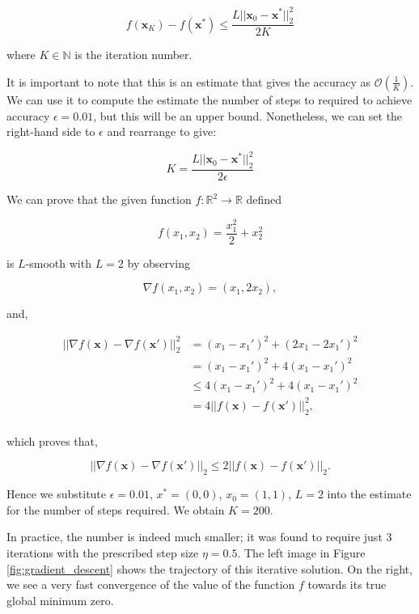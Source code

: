 \documentclass[12pt]{article}
\begin{document}
\[f(\bm{x}_K) - f(\bm{x}^*) \leq \frac{L||\bm{x}_0-\bm{x}^*||_2^2}{2K}\]

where $K\in\mathbb{N}$ is the iteration number.

It is important to note that this is an estimate that gives the accuracy as $\mathcal{O}(\frac{1}{K})$.
We can use it to compute the estimate the number of steps to required to achieve accuracy $\epsilon=0.01$,
but this will be an upper bound.
Nonetheless, we can set the right-hand side to $\epsilon$ and rearrange to give:

\[K = \frac{L||\bm{x}_0-\bm{x}^*||_2^2}{2\epsilon}\]

We can prove that the given function $f:\mathbb{R}^2\rightarrow\mathbb{R}$ defined

\[f(x_1,x_2) = \frac{x_1^2}{2} + x_2^2\]

is $L$-smooth with $L=2$ by observing

\[\nabla f(x_1, x_2) = (x_1, 2x_2),\]

and,

\begin{align*}
    ||\nabla f(\bm{x}) - \nabla f(\bm{x}')||_2^2 & = (x_1-x_1')^2 + (2x_1-2x_1')^2 \\
                                            & = (x_1-x_1')^2 + 4(x_1-x_1')^2 \\
                                            & \leq 4(x_1-x_1')^2 + 4(x_1-x_1')^2 \\
                                            & = 4||f(\bm{x}) - f(\bm{x}')||_2^2, \\
\end{align*}

which proves that,

\[
    ||\nabla f(\bm{x}) - \nabla f(\bm{x}')||_2 \leq 2||f(\bm{x}) - f(\bm{x}')||_2.
\]

Hence we substitute $\epsilon=0.01$, $x^*=(0,0)$, $x_0=(1,1)$, $L=2$ into the estimate for the number of steps required.
We obtain $K=200$.

In practice, the number is indeed much smaller; it was found to require just 3 iterations with the prescribed step size $\eta=0.5$.
The left image in Figure \ref{fig:gradient_descent} shows the trajectory of this iterative solution.
On the right, we see a very fast convergence of the value of the function $f$ towards its true global minimum zero.
\end{document}
